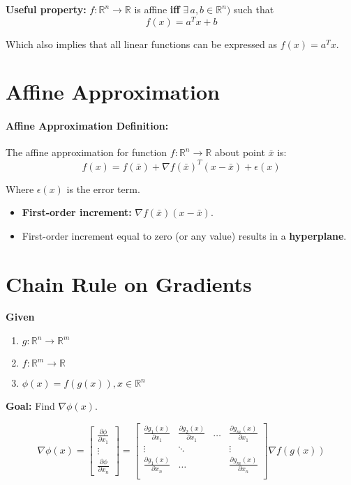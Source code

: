 \documentclass[a4paper,12pt]{report}
\def\reals{\mathbb{R}}
\begin{document}
\textbf{Useful property: } $f:\reals^n\to\reals$ is affine \textbf{iff} $\exists\, a,b \in \reals^n)$ such that\begin{equation}
f(x) = a^T x + b
\end{equation}

Which also implies that all linear functions can be expressed as $f(x) = a^T x$.

\section{Affine Approximation}

\paragraph{Affine Approximation Definition: } The affine approximation for function $f:\reals^n\to\reals$ about point $\bar{x}$ is: \begin{equation}
f(x) = f(\bar{x}) + \nabla f(\bar{x})^T(x-\bar{x}) + \epsilon(x)
\end{equation}

Where $\epsilon(x)$ is the error term.

\begin{itemize}
\item \textbf{First-order increment: } $\nabla f(\bar{x})(x-\bar{x})$.
\item First-order increment equal to zero (or any value) results in a \textbf{hyperplane}.
\end{itemize}

\section{Chain Rule on Gradients}

\textbf{Given } 
\begin{enumerate}
\item $g:\reals^n\to\reals^m$
\item $f:\reals^m\to\reals$
\item $\phi(x) = f(g(x)), x\in\reals^n$
\end{enumerate}

\textbf{Goal: } Find $\nabla\phi(x)$.

\begin{equation}
\nabla\phi(x) = 
\begin{bmatrix}
\frac{\partial \phi}{\partial x_1} \\
\vdots \\
\frac{\partial \phi}{\partial x_n} 
\end{bmatrix} = 
\begin{bmatrix}
\frac{\partial g_1(x)}{\partial x_1} & \frac{\partial g_2(x)}{\partial x_1} & \dots & \frac{\partial g_m(x)}{\partial x_1} \\
\vdots & \ddots & & \vdots \\
\frac{\partial g_1(x)}{\partial x_n} & \dots & & \frac{\partial g_m(x)}{\partial x_n} \\
\end{bmatrix} 
\nabla f(g(x))
\end{equation}
\end{document}
